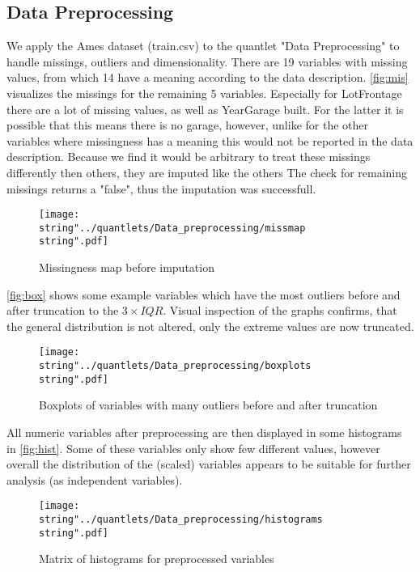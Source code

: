 
\subsection{Data Preprocessing}
We apply the Ames dataset (train.csv) to the quantlet "Data Preprocessing" to handle missings, outliers and dimensionality. 
There are 19 variables with missing values, from which 14 have a meaning according to the data description. 
\autoref{fig:mis} visualizes the missings for the remaining 5 variables. Especially for LotFrontage there are a lot of missing values, as well as YearGarage built. For the latter it is possible that this means there is no garage, however, unlike for the other variables where missingness has a meaning this would not be reported in the data description. Because we find it would be arbitrary to treat these missings differently then others, they are imputed like the others
The check for remaining missings returns a "false", thus the imputation was successfull. 

\begin{figure}[H]
  \centering
\texttt{[image: \\string"../quantlets/Data\_preprocessing/missmap\\string".pdf]}
  \caption{Missingness map before imputation}\label{fig:mis}
\end{figure}
 
\autoref{fig:box} shows some example variables which have the most outliers before and after truncation to the $3 \times IQR$. Visual inspection of the graphs confirms, that the general distribution is not altered, only the extreme values are now truncated. 
\begin{figure}[H]
  \centering
\texttt{[image: \\string"../quantlets/Data\_preprocessing/boxplots\\string".pdf]}
  \caption{Boxplots of variables with many outliers before and after truncation}\label{fig:box}
\end{figure}

All numeric variables after preprocessing are then displayed in some histograms in \autoref{fig:hist}. Some of these variables only show few different values, however overall the distribution of the (scaled) variables appears to be suitable for further analysis (as independent variables). 
 
\begin{figure}[H]
  \centering
\texttt{[image: \\string"../quantlets/Data\_preprocessing/histograms\\string".pdf]}
  \caption{Matrix of histograms for preprocessed variables}\label{fig:step}
\end{figure}

